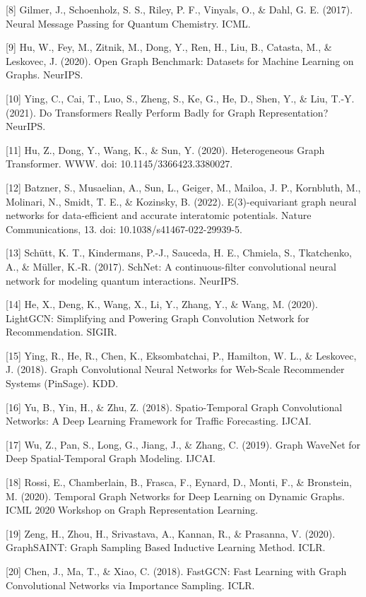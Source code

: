 {[}8{]} Gilmer, J., Schoenholz, S. S., Riley, P. F., Vinyals, O., \& Dahl, G. E. (2017). Neural Message Passing for Quantum Chemistry. ICML.

{[}9{]} Hu, W., Fey, M., Zitnik, M., Dong, Y., Ren, H., Liu, B., Catasta, M., \& Leskovec, J. (2020). Open Graph Benchmark: Datasets for Machine Learning on Graphs. NeurIPS.

{[}10{]} Ying, C., Cai, T., Luo, S., Zheng, S., Ke, G., He, D., Shen, Y., \& Liu, T.-Y. (2021). Do Transformers Really Perform Badly for Graph Representation? NeurIPS.

{[}11{]} Hu, Z., Dong, Y., Wang, K., \& Sun, Y. (2020). Heterogeneous Graph Transformer. WWW. doi: 10.1145/3366423.3380027.

{[}12{]} Batzner, S., Musaelian, A., Sun, L., Geiger, M., Mailoa, J. P., Kornbluth, M., Molinari, N., Smidt, T. E., \& Kozinsky, B. (2022). E(3)-equivariant graph neural networks for data-efficient and accurate interatomic potentials. Nature Communications, 13. doi: 10.1038/s41467-022-29939-5.

{[}13{]} Schütt, K. T., Kindermans, P.-J., Sauceda, H. E., Chmiela, S., Tkatchenko, A., \& Müller, K.-R. (2017). SchNet: A continuous-filter convolutional neural network for modeling quantum interactions. NeurIPS.

{[}14{]} He, X., Deng, K., Wang, X., Li, Y., Zhang, Y., \& Wang, M. (2020). LightGCN: Simplifying and Powering Graph Convolution Network for Recommendation. SIGIR.

{[}15{]} Ying, R., He, R., Chen, K., Eksombatchai, P., Hamilton, W. L., \& Leskovec, J. (2018). Graph Convolutional Neural Networks for Web-Scale Recommender Systems (PinSage). KDD.

{[}16{]} Yu, B., Yin, H., \& Zhu, Z. (2018). Spatio-Temporal Graph Convolutional Networks: A Deep Learning Framework for Traffic Forecasting. IJCAI.

{[}17{]} Wu, Z., Pan, S., Long, G., Jiang, J., \& Zhang, C. (2019). Graph WaveNet for Deep Spatial-Temporal Graph Modeling. IJCAI.

{[}18{]} Rossi, E., Chamberlain, B., Frasca, F., Eynard, D., Monti, F., \& Bronstein, M. (2020). Temporal Graph Networks for Deep Learning on Dynamic Graphs. ICML 2020 Workshop on Graph Representation Learning.

{[}19{]} Zeng, H., Zhou, H., Srivastava, A., Kannan, R., \& Prasanna, V. (2020). GraphSAINT: Graph Sampling Based Inductive Learning Method. ICLR.

{[}20{]} Chen, J., Ma, T., \& Xiao, C. (2018). FastGCN: Fast Learning with Graph Convolutional Networks via Importance Sampling. ICLR.

